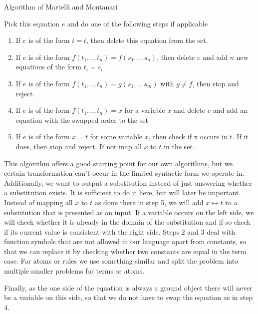 \begin{algorithm}
    \caption{Algorithm of Martelli and Montanari}
\begin{algorithmic}
    \State Pick this equation $e$ and do one of the following steps if applicable
    \begin{enumerate}
        \item If $e$ is of the form $t = t$, then delete this equation from the set.
        \item If $e$ is of the form $f(t_1, .., t_n) = f(s_1,.., s_n)$, then delete $e$ and add $n$ new equations of the form $t_i = s_i$
        \item If $e$ is of the form $f(t_1, .., t_n) = g(s_1,.., s_m)$ with $g \neq f$, then stop and reject.
        \item If $e$ is of the form $f(t_1,..,t_n) = x$ for a variable $x$ and delete $e$ and add an equation with the swapped order to the set
        \item If $e$ is of the form $x=t$ for some variable $x$, then check if x occurs in t. If it does, then stop and reject. If not map all $x$ to $t$ in the set.
    \end{enumerate}
    \EndWhile
\end{algorithmic}
\end{algorithm}

This algorithm offers a good starting point for our own algorithms, but we certain transformation can't occur in the limited syntactic form we operate in. Additionally, we want to output a substitution instead of just answering whether a substitution exists. It is sufficient to do it here, but will later be important. Instead of mapping all $x$ to $t$ as done there in step 5, we will add $x\mapsto t$ to a substitution that is presented as an input. If a variable occurs on the left side, we will check whether it is already in the domain of the substitution and if so check if its current value is consistent with the right side.
Steps 2 and 3 deal with function symbols that are not allowed in our language apart from constants, so that we can replace it by checking whether two constants are equal in the term case. For atoms or rules we use something similar and split the problem into multiple smaller problems for terms or atoms.

Finally, as the one side of the equation is always a ground object there will never be a variable on this side, so that we do not have to swap the equation as in step 4.

